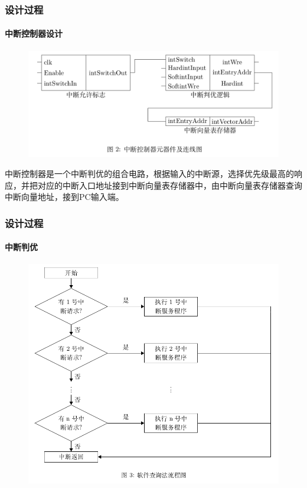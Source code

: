 \documentclass[xcolor=dvipsnames]{beamer}
\begin{document}
\begin{frame}
	\frametitle{设计过程}
	\framesubtitle{中断控制器设计}
	
	\begin{figure}
		\centering
		\includegraphics[scale=0.25]{img/2.png}
	\end{figure}
	
	中断控制器是一个中断判优的组合电路，根据输入的中断源，选择优先级最高的响应，并把对应的中断入口地址接到中断向量表存储器中，由中断向量表存储器查询中断向量地址，接到PC输入端。
\end{frame}

\begin{frame}
	\frametitle{设计过程}
	\framesubtitle{中断判优}
	
	\begin{figure}
		\centering
		\includegraphics[scale=0.25]{img/3.png}
	\end{figure}
\end{frame}
\end{document}
